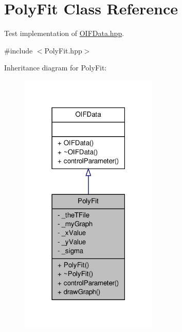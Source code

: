 \hypertarget{classPolyFit}{
\section{PolyFit Class Reference}
\label{de/d89/classPolyFit}
}


Test implementation of \hyperlink{OIFData_8hpp}{OIFData.hpp}.  




{\ttfamily \#include $<$PolyFit.hpp$>$}



Inheritance diagram for PolyFit:
\nopagebreak
\begin{figure}[H]
\begin{center}
\leavevmode
\includegraphics[width=186pt]{da/d58/classPolyFit__inherit__graph}
\end{center}
\end{figure}


